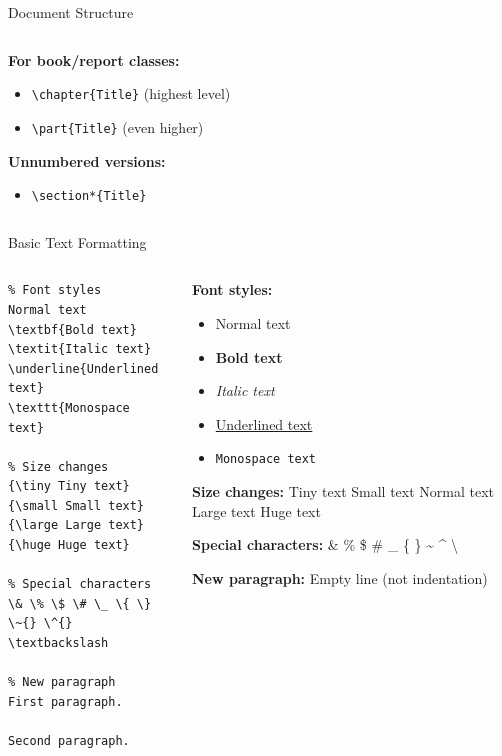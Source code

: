 \begin{frame}[fragile]{Document Structure}
\begin{columns}
\begin{column}{0.5\textwidth}
            \textbf{For book/report classes:}
            \begin{itemize}
                \item \texttt{\textbackslash chapter\{Title\}} (highest level)
                \item \texttt{\textbackslash part\{Title\}} (even higher)
            \end{itemize}
            
            \textbf{Unnumbered versions:}
            \begin{itemize}
                \item \texttt{\textbackslash section*\{Title\}}
            \end{itemize}
        \end{column}
    \end{columns}
\end{frame}

\begin{frame}[fragile]{Basic Text Formatting}
    \begin{columns}
        \begin{column}{0.5\textwidth}
\begin{lstlisting}
% Font styles
Normal text
\textbf{Bold text}
\textit{Italic text}
\underline{Underlined text}
\texttt{Monospace text}

% Size changes
{\tiny Tiny text} 
{\small Small text}
{\large Large text} 
{\huge Huge text}

% Special characters
\& \% \$ \# \_ \{ \} \~{} \^{} 
\textbackslash

% New paragraph
First paragraph.

Second paragraph.
\end{lstlisting}
        \end{column}
        
        \begin{column}{0.5\textwidth}
            \textbf{Font styles:}
            \begin{itemize}
                \item Normal text
                \item \textbf{Bold text}
                \item \textit{Italic text}
                \item \underline{Underlined text}
                \item \texttt{Monospace text}
            \end{itemize}
            
            \textbf{Size changes:}
            {\tiny Tiny text} {\small Small text} Normal text {\large Large text} {\huge Huge text}
            
            \textbf{Special characters:}
            \& \% \$ \# \_ \{ \} \~{} \^{} \textbackslash
            
            \textbf{New paragraph:} Empty line (not indentation)
        \end{column}
    \end{columns}
\end{frame}

